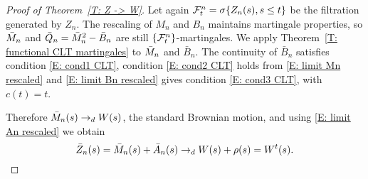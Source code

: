 \begin{proof}[Proof of Theorem~\ref{T: Z -> W}]
	Let again $\mathcal{F}^n_{t} = \sigma \{ Z_n(s), s \leq t \}$ be the filtration generated by $Z_n$.
	The rescaling of $M_n$ and $B_n$ maintains martingale properties,
	so $\bar{M}_n$ and $\bar{Q}_n = \bar{M}_n^2 - \bar{B}_n$ are still $\{\mathcal{F}^n_{t}\}$-martingales.
	We apply Theorem~\ref{T: functional CLT martingales} to $\bar{M}_n$ and $\bar{B}_n$.
	The continuity of $\bar{B}_n$ satisfies condition \eqref{E: cond1 CLT}, 
	condition \eqref{E: cond2 CLT} holds from \eqref{E: limit Mn rescaled}
	and \eqref{E: limit Bn rescaled} gives condition \eqref{E: cond3 CLT}, with $c(t) = t$.
	
	Therefore $\bar{M}_n(s) \rightarrow_d W(s)$, the standard Brownian motion, and using \eqref{E: limit An rescaled} we obtain
	\begin{equation}
	\bar{Z}_n(s) = \bar{M}_n(s) + \bar{A}_n(s) \rightarrow_d W(s) + \rho (s) = W^t(s).
	\end{equation}
\end{proof}

